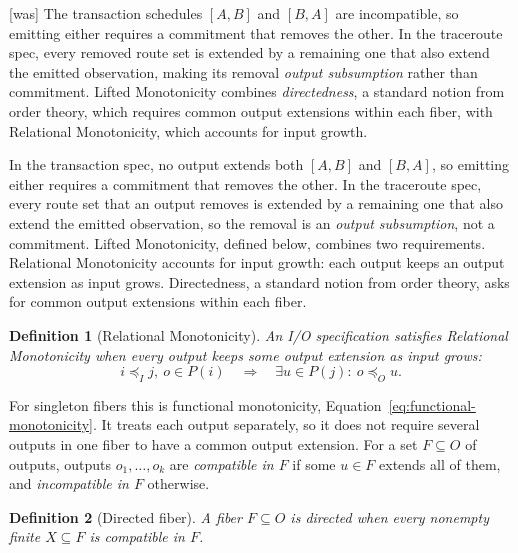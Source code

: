 \documentclass[sigconf]{cidr-2027}
\newtheorem{definition}{Definition}
\theoremstyle{remark}
\newcommand{\InputOrd}{\preceq_I}
\newcommand{\OutputOrd}{\preceq_O}
\newcommand{\commitment}{commitment\xspace}
\newcommand{\ingrows}{grows\xspace}          %
\newcommand{\outrel}{extends\xspace}          %
\newcommand{\outrelbase}{extend\xspace}       %
\newcommand{\outrelpast}{extended\xspace}     %
\newcommand{\outnoun}{output extension\xspace}%
\newcommand{\outnouns}{output extensions\xspace}
\newcommand{\spectype}[1][]{I/O specification#1\xspace}
\newcommand{\fiber}[1]{P(#1)}
\begin{document}
{\footnotesize\color{black!50}\noindent\textsf{[was]} The transaction schedules $[A,B]$ and $[B,A]$ are incompatible, so emitting
either requires a \commitment that removes the other.  In the traceroute spec,
every removed route set is \outrelpast by a remaining one that also \outrelbase
the emitted observation, making its removal \emph{output subsumption} rather
than \commitment.  Lifted Monotonicity combines \emph{directedness}, a standard notion from order
theory, which requires
common \outnouns within each fiber, with Relational Monotonicity, which
accounts for input growth.\par}

\color{blue!70!black}In the transaction spec, no output \outrel both $[A,B]$ and $[B,A]$, so
emitting either requires a \commitment that removes the other.  In the
traceroute spec, every route set that an output removes is \outrelpast by a
remaining one that also \outrelbase the emitted observation, so the removal is
an \emph{output subsumption}, not a \commitment.  Lifted Monotonicity, defined
below, combines two requirements.  Relational Monotonicity accounts for input
growth: each output keeps an \outnoun as input \ingrows.  Directedness, a
standard notion from order theory, asks for common \outnouns within each
fiber.\color{black}

\label{sec:lifted-monotonicity}
\begin{definition}[Relational Monotonicity]
\label{def:relational-monotonicity}
An \spectype satisfies \emph{Relational Monotonicity}
when every output keeps some \outnoun as input \ingrows:
        \begin{equation}
  i\InputOrd j,\ o\in\fiber{i}
  \quad\Longrightarrow\quad
  \exists u\in\fiber{j}:\ o\OutputOrd u.
  \label{eq:relational-monotonicity}
        \end{equation}
\end{definition}

For singleton fibers this is functional monotonicity,
Equation~\ref{eq:functional-monotonicity}.  It treats each output separately,
so it does not require several outputs in one fiber to have a common \outnoun.
For a set $F\subseteq O$ of outputs, outputs $o_1,\ldots,o_k$ are
\emph{compatible in $F$} if some $u\in F$ \outrel all of them, and
\emph{incompatible in $F$} otherwise.

\begin{definition}[Directed fiber]
\label{def:fiber-directedness}
A fiber $F\subseteq O$ is \emph{directed} when every nonempty finite
$X\subseteq F$ is compatible in $F$.
\end{definition}
\end{document}
